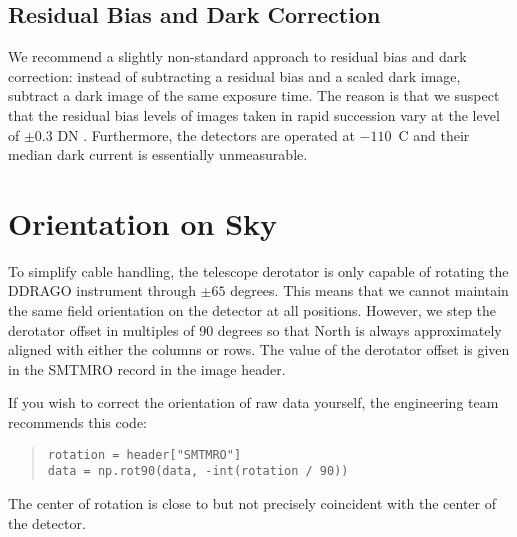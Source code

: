 \subsection{Residual Bias and Dark Correction}

We recommend a slightly non-standard approach to residual bias and dark correction: instead of subtracting a residual bias and a scaled dark image, subtract a dark image of the same exposure time. The reason is that we suspect that the residual bias levels of images taken in rapid succession vary at the level of $\pm 0.3$ DN \cite{ohp}. Furthermore, the detectors are operated at $-110$~C and their median dark current is essentially unmeasurable.

\section{Orientation on Sky}

To simplify cable handling, the telescope derotator is only capable of rotating the DDRAGO instrument through $\pm65$ degrees. This means that we cannot maintain the same field orientation on the detector at all positions. However, we step the derotator offset in multiples of 90 degrees so that North is always approximately aligned with either the columns or rows. The value of the derotator offset is given in the SMTMRO record in the image header.

If you wish to correct the orientation of raw data yourself, the engineering team recommends this code:
\begin{quote}\footnotesize\begin{verbatim}
rotation = header["SMTMRO"]
data = np.rot90(data, -int(rotation / 90))
\end{verbatim}\end{quote}

The center of rotation is close to but not precisely coincident with the center of the detector.


